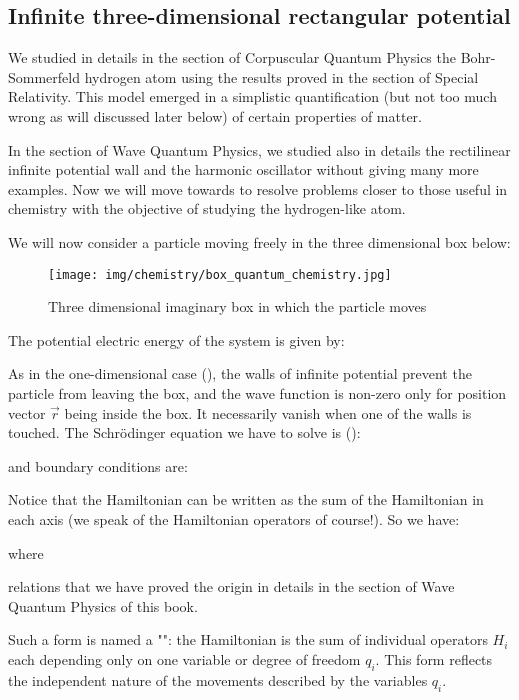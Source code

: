 	\subsection{Infinite three-dimensional rectangular potential}
	We studied in details in the section of Corpuscular Quantum Physics the Bohr-Sommerfeld hydrogen atom using the results proved in the section of Special Relativity. This model emerged in a simplistic quantification (but not too much wrong as will discussed later below) of certain properties of matter.
	
	In the section of Wave Quantum Physics, we studied also in details the rectilinear infinite potential wall and the harmonic oscillator without giving many more examples. Now we will move towards to resolve problems closer to those useful in chemistry with the objective of studying the hydrogen-like atom.
	
	We will now consider a particle moving freely in the three dimensional box below:
	\begin{figure}[H]
		\begin{center}
		\texttt{[image: img/chemistry/box\_quantum\_chemistry.jpg]}
		\end{center}	
		\caption[]{Three dimensional imaginary box in which the particle moves}
	\end{figure}

	The potential electric energy of the system is given by:	

	
	As in the one-dimensional case (), the walls of infinite potential prevent the particle from leaving the box, and the wave function is non-zero only for position vector $\vec{r}$ being inside the box. It  necessarily vanish when one of the walls is touched. The Schrödinger equation we have to solve is ():
	
	and boundary conditions are:
	
	Notice that the Hamiltonian can be written as the sum of the Hamiltonian in each axis (we speak of the Hamiltonian operators of course!). So we have:
	
	where
	
	relations that we have proved the origin in details in the section of Wave Quantum Physics of this book.
	
	Such a form is named a "": the Hamiltonian is the sum of individual operators $H_i$ each depending only on one variable or degree of freedom $q_i$. This form reflects the independent nature of the movements described by the variables $q_i$.
	
